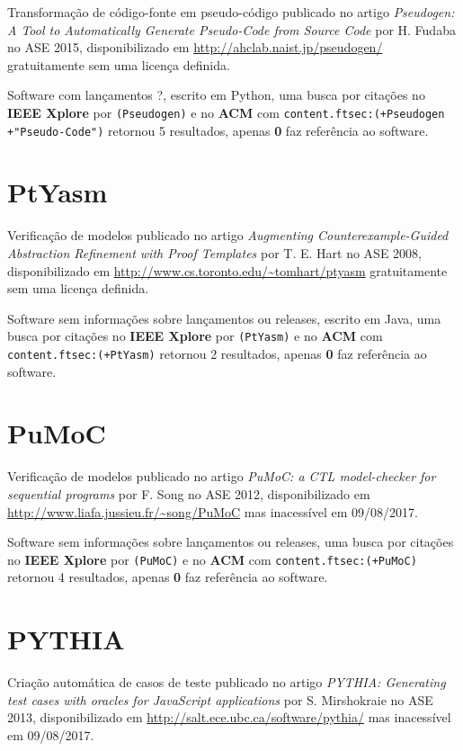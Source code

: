 Transformação de código-fonte em pseudo-código
publicado no artigo {\it Pseudogen: A Tool to Automatically Generate Pseudo-Code from Source Code}
por H. Fudaba
no ASE 2015,
disponibilizado em \url{http://ahclab.naist.jp/pseudogen/}
gratuitamente
sem uma licença definida.

Software com lançamentos ?,
escrito em Python,
uma busca por citações no {\bf IEEE Xplore} por
\texttt{(Pseudogen)}
e no {\bf ACM} com
\texttt{content.ftsec:(+Pseudogen +"Pseudo-Code")}
retornou
5 resultados, apenas
{\bf 0} faz referência ao software.



\section{PtYasm}

Verificação de modelos
publicado no artigo {\it Augmenting Counterexample-Guided Abstraction Refinement with Proof Templates}
por T. E. Hart
no ASE 2008,
disponibilizado em \url{http://www.cs.toronto.edu/~tomhart/ptyasm}
gratuitamente
sem uma licença definida.

Software sem informações sobre lançamentos ou releases,
escrito em Java,
uma busca por citações no {\bf IEEE Xplore} por
\texttt{(PtYasm)}
e no {\bf ACM} com
\texttt{content.ftsec:(+PtYasm)}
retornou
2 resultados, apenas
{\bf 0} faz referência ao software.



\section{PuMoC}

Verificação de modelos
publicado no artigo {\it PuMoC: a CTL model-checker for sequential programs}
por F. Song
no ASE 2012,
disponibilizado em \url{http://www.liafa.jussieu.fr/~song/PuMoC}
mas inacessível em 09/08/2017.

Software sem informações sobre lançamentos ou releases,
uma busca por citações no {\bf IEEE Xplore} por
\texttt{(PuMoC)}
e no {\bf ACM} com
\texttt{content.ftsec:(+PuMoC)}
retornou
4 resultados, apenas
{\bf 0} faz referência ao software.



\section{PYTHIA}

Criação automática de casos de teste
publicado no artigo {\it PYTHIA: Generating test cases with oracles for JavaScript applications}
por S. Mirshokraie
no ASE 2013,
disponibilizado em \url{http://salt.ece.ubc.ca/software/pythia/}
mas inacessível em 09/08/2017.

